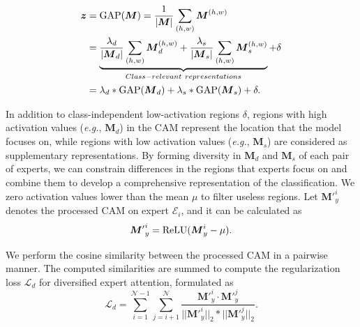 \documentclass[letterpaper]{article} %
\newcommand{\eg}{{\emph{e.g.}}}
\begin{document}
\begin{equation}
\begin{aligned}
\boldsymbol{z}&={\rm GAP}(\boldsymbol{M})=\frac{1}{|\boldsymbol{M}|}\sum_{(h,w)}{\boldsymbol{M}^{(h,w)}}\\&=\underbrace{\frac{\lambda_d}{|\boldsymbol{M}_d|}\sum_{(h,w)}{\boldsymbol{M}^{(h,w)}_d}+\frac{\lambda_s}{|\boldsymbol{M}_s|}\sum_{(h,w)}{\boldsymbol{M}^{(h,w)}_s}}_{Class-relevant\ representations}+\delta\\&=\lambda_d*{\rm GAP}(\boldsymbol{M}_d)+\lambda_s*{\rm GAP}(\boldsymbol{M}_s)+\delta.
\label{eq:gap}
\end{aligned}
\end{equation}

In addition to class-independent low-activation regions $\delta$, regions with high activation values (\eg, $\boldsymbol{M}_d$) in the CAM represent the location that the model focuses on, while regions with low activation values (\eg, $\boldsymbol{M}_s$) are considered as supplementary representations. By forming diversity in $\boldsymbol{M}_d$ and $\boldsymbol{M}_s$ of each pair of experts, we can constrain differences in the regions that experts focus on and combine them to develop a comprehensive representation of the classification. We zero activation values lower than the mean $\mu$ to filter useless regions. Let $\boldsymbol{M}\mathrm{'}_{y}^{i}$ denotes the processed CAM on expert $\mathcal{E}_i$, and it can be calculated as
\begin{equation}
\boldsymbol{M}\mathrm{'}_{y}^{i}={\rm{ReLU}}(\boldsymbol{M}_{y}^{i}-\mu).
\label{eq:cam_relu}
\end{equation}  

We perform the cosine similarity between the processed CAM in a pairwise manner. The computed similarities are summed to compute the regularization loss $\mathcal{L}_d$ for diversified expert attention, formulated as
\begin{equation}
\mathcal{L}_d=\sum_{i=1}^{\mathcal{N}-1}\sum_{j=i+1}^{\mathcal{N}}\frac{\boldsymbol{M}\mathrm{'}_{y}^{i}\cdot\boldsymbol{M}\mathrm{'}_{y}^{j}}{\big|\big|\boldsymbol{M}\mathrm{'}_{y}^{i}\big|\big|_2*\big|\big|\boldsymbol{M}\mathrm{'}_{y}^{j}\big|\big|_2}.
\label{eq:diver_loss}
\end{equation}  
\end{document}
